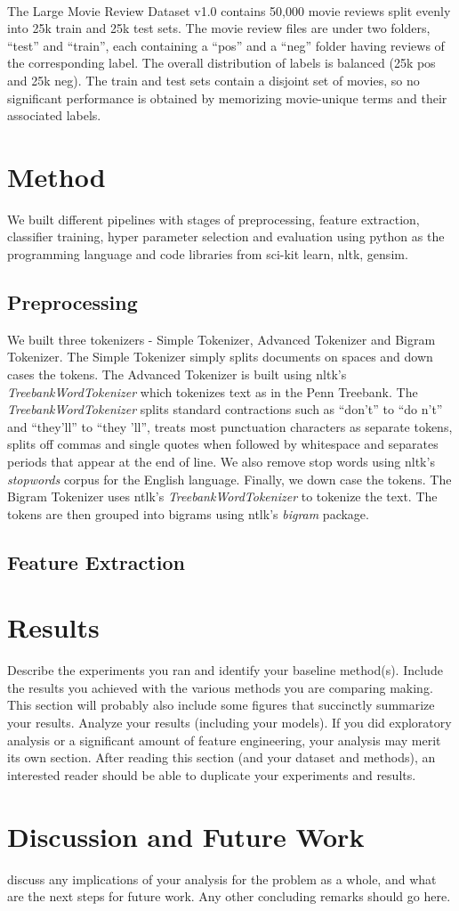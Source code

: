 \documentclass[11pt, oneside]{article}
\begin{document}
\paragraph{} 
The Large Movie Review Dataset v1.0 contains 50,000 movie reviews split evenly into 25k train and 25k test sets. The movie review files are under two folders, ``test'' and ``train'', each containing a ``pos'' and a ``neg'' folder having reviews of the corresponding label. The overall distribution of labels is balanced (25k pos and 25k neg). The train and test sets contain a disjoint set of movies, so no significant performance is obtained by memorizing movie-unique terms and their associated labels.
\section{Method}
We built different pipelines with stages of preprocessing, feature extraction, classifier training, hyper parameter selection and evaluation using python as the programming language and code libraries from sci-kit learn, nltk, gensim.
\subsection{Preprocessing}
We built three tokenizers - Simple Tokenizer, Advanced Tokenizer and Bigram Tokenizer. The Simple Tokenizer simply splits documents on spaces and down cases the tokens. The Advanced Tokenizer is built using nltk's \textit{TreebankWordTokenizer} which tokenizes text as in the Penn Treebank. The \textit{TreebankWordTokenizer} splits standard contractions such as ``don't'' to ``do n't'' and ``they'll'' to ``they 'll'', treats most punctuation characters as separate tokens, splits off commas and single quotes when followed by whitespace and separates periods that appear at the end of line. We also remove stop words using nltk's \textit{stopwords} corpus for the English language. Finally, we down case the tokens. The Bigram Tokenizer uses ntlk's \textit{TreebankWordTokenizer} to tokenize the text. The tokens are then grouped into bigrams using ntlk's \textit{bigram} package.
\subsection{Feature Extraction}
\section{Results}
Describe the experiments you ran and identify your baseline method(s). Include the results you achieved with the various methods you are comparing making. This section will probably also include some figures that succinctly summarize your results. Analyze your results (including your models). If you did exploratory analysis or a significant amount of feature engineering, your analysis may merit its own section. After reading this section (and your dataset and methods), an interested reader should be able to duplicate your experiments and results.
\section{Discussion and Future Work}
discuss any implications of your analysis for the problem as a whole, and what are the next steps for future work. Any other concluding remarks should go here.


\end{document}
